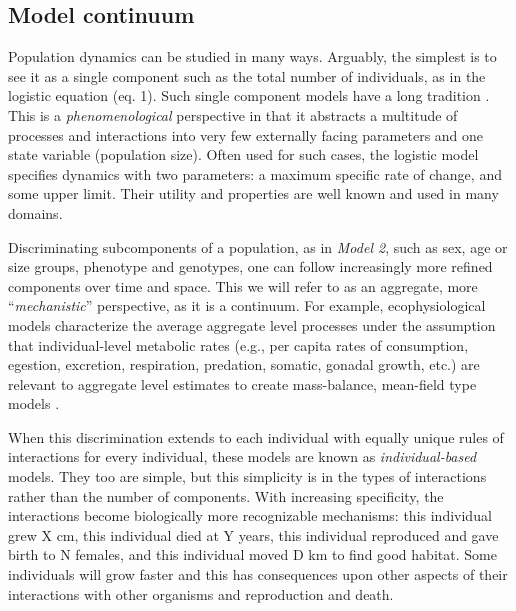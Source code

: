 \documentclass[
	letterpaper, %
	10pt, %
]{article}
\begin{document}

 

\begin{appendices}

 
\section{Model continuum} 
\label{continuum}
 
Population dynamics can be studied in many ways. Arguably, the simplest
is to see it as a single component such as the total number of individuals,
as in the logistic equation (eq. 1). Such single component models
have a long tradition \cite{Verhulst_1845, McKendrick_Pai_1912, Pearl_Reed_1920, Lotka_1925, Bacaër_2011}.
This is a \emph{phenomenological} perspective in
that it abstracts a multitude of processes and interactions into very
few externally facing parameters and one state variable (population
size). Often used for such cases, the logistic model specifies dynamics
with two parameters: a maximum specific rate of change, and some upper
limit. Their utility and properties are well known and used in many
domains.

Discriminating subcomponents of a population, as in \emph{Model 2},
such as sex, age or size groups, phenotype and genotypes, one can
follow increasingly more refined components over time and space. This
we will refer to as an aggregate, more ``\emph{mechanistic}''
perspective, as it is a continuum. For example, ecophysiological models characterize the
average aggregate level processes under the assumption that individual-level
metabolic rates (e.g., per capita rates of consumption, egestion,
excretion, respiration, predation, somatic, gonadal growth, etc.)
are relevant to aggregate level estimates to create mass-balance,
mean-field type models \cite{Kitchell_1974, Boudreau_Dickie_1992, Bundy_et_al_2004}.

When this discrimination extends to each individual with equally unique
rules of interactions for every individual, these models are known
as \emph{individual-based} models. They too are simple, but this
simplicity is in the types of interactions rather than the number
of components. With increasing specificity, the interactions become biologically more recognizable mechanisms:
this individual grew X cm, this individual died at Y years, this
individual reproduced and gave birth to N females, and this individual
moved D km to find good habitat. Some individuals will grow faster
and this has consequences upon other aspects of their interactions
with other organisms and reproduction and death.


\end{appendices}
\end{document}
